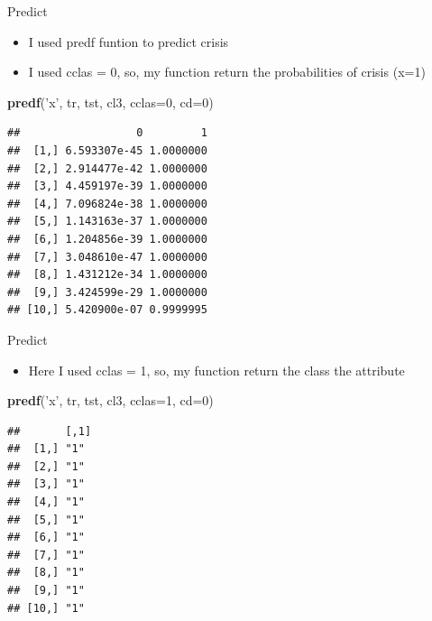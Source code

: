 \documentclass[
  10pt,
  ignorenonframetext,
]{beamer}
\newenvironment{Shaded}{\begin{snugshade}}{\end{snugshade}}
\newcommand{\DataTypeTok}[1]{\textcolor[rgb]{0.13,0.29,0.53}{#1}}
\newcommand{\DecValTok}[1]{\textcolor[rgb]{0.00,0.00,0.81}{#1}}
\newcommand{\KeywordTok}[1]{\textcolor[rgb]{0.13,0.29,0.53}{\textbf{#1}}}
\newcommand{\NormalTok}[1]{#1}
\newcommand{\StringTok}[1]{\textcolor[rgb]{0.31,0.60,0.02}{#1}}
\providecommand{\tightlist}{%
  \setlength{\itemsep}{0pt}\setlength{\parskip}{0pt}}
\begin{document}
\begin{frame}[fragile]{Predict}
\protect\hypertarget{predict-9}{}

\begin{itemize}
\tightlist
\item
  I used predf funtion to predict crisis
\item
  I used cclas = 0, so, my function return the probabilities of crisis
  (x=1)
\end{itemize}

\begin{Shaded}
\begin{Highlighting}[]
\KeywordTok{predf}\NormalTok{(}\StringTok{'x'}\NormalTok{, tr, tst, cl3, }\DataTypeTok{cclas=}\DecValTok{0}\NormalTok{, }\DataTypeTok{cd=}\DecValTok{0}\NormalTok{)}
\end{Highlighting}
\end{Shaded}

\begin{verbatim}
##                  0         1
##  [1,] 6.593307e-45 1.0000000
##  [2,] 2.914477e-42 1.0000000
##  [3,] 4.459197e-39 1.0000000
##  [4,] 7.096824e-38 1.0000000
##  [5,] 1.143163e-37 1.0000000
##  [6,] 1.204856e-39 1.0000000
##  [7,] 3.048610e-47 1.0000000
##  [8,] 1.431212e-34 1.0000000
##  [9,] 3.424599e-29 1.0000000
## [10,] 5.420900e-07 0.9999995
\end{verbatim}

\end{frame}

\begin{frame}[fragile]{Predict}
\protect\hypertarget{predict-10}{}

\begin{itemize}
\tightlist
\item
  Here I used cclas = 1, so, my function return the class the attribute
\end{itemize}

\begin{Shaded}
\begin{Highlighting}[]
\KeywordTok{predf}\NormalTok{(}\StringTok{'x'}\NormalTok{, tr, tst, cl3, }\DataTypeTok{cclas=}\DecValTok{1}\NormalTok{, }\DataTypeTok{cd=}\DecValTok{0}\NormalTok{)}
\end{Highlighting}
\end{Shaded}

\begin{verbatim}
##       [,1]
##  [1,] "1" 
##  [2,] "1" 
##  [3,] "1" 
##  [4,] "1" 
##  [5,] "1" 
##  [6,] "1" 
##  [7,] "1" 
##  [8,] "1" 
##  [9,] "1" 
## [10,] "1"
\end{verbatim}

\end{frame}
\end{document}
